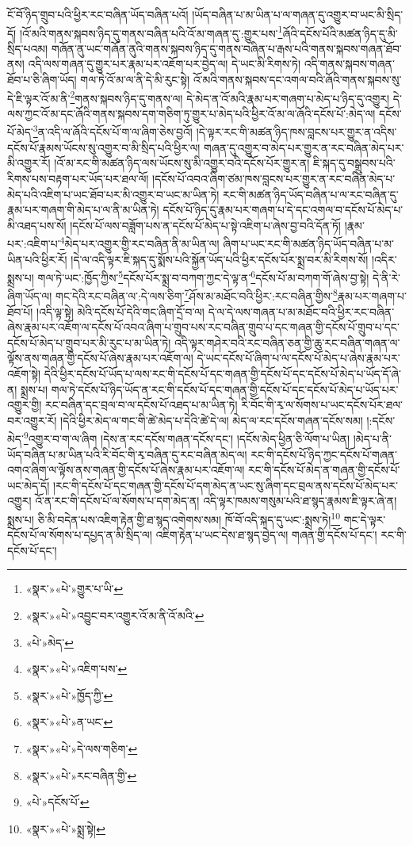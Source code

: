 ངོ་བོ་ཉིད་གྲུབ་པའི་ཕྱིར་རང་བཞིན་ཡོད་བཞིན་པའོ། །ཡོད་བཞིན་པ་མ་ཡིན་པ་ལ་གཞན་དུ་འགྱུར་བ་ཡང་མི་སྲིད་དོ། །འོ་མའི་གནས་སྐབས་ཉིད་དུ་གནས་བཞིན་པའི་འོ་མ་གཞན་དུ་:གྱུར་པས་\footnote{«སྣར་»«པེ་»གྱུར་པ་ཡི་}ཞོའི་དངོས་པོའི་མཚན་ཉིད་དུ་མི་སྲིད་པའམ། གཞོན་ནུ་ཡང་གཞོན་ནུའི་གནས་སྐབས་ཉིད་དུ་གནས་བཞིན་པ་རྒས་པའི་གནས་སྐབས་གཞན་ཐོབ་ནས། འདི་ལས་གཞན་དུ་གྱུར་པར་རྣམ་པར་འཇོག་པར་བྱེད་ལ། དེ་ཡང་མི་རིགས་ཏེ། འདི་གནས་སྐབས་གཞན་ཐོབ་པ་ཅི་ཞིག་ཡོད། གལ་ཏེ་འོ་མ་ལ་ནི་དེ་མི་རུང་སྟེ། འོ་མའི་གནས་སྐབས་དང་འགལ་བའི་ཞོའི་གནས་སྐབས་སུ་དེ་ཇི་ལྟར་འོ་མ་ནི་\footnote{«སྣར་»«པེ་»འབྱུང་བར་འགྱུར་འོ་མ་ནི་འོ་མའི་}གནས་སྐབས་ཉིད་དུ་གནས་ལ། དེ་མེད་ན་འོ་མའི་རྣམ་པར་གཞག་པ་མེད་པ་ཉིད་དུ་འགྱུར། དེ་ལས་ཀྱང་འོ་མ་དང་ཞོའི་གནས་སྐབས་དག་གཅིག་ཏུ་གྱུར་པ་མེད་པའི་ཕྱིར་འོ་མ་ལ་ཞོའི་དངོས་པོ་:མེད་ལ། དངོས་པོ་མེད་\footnote{«པེ་»མེད་}ན་འདི་ལ་ཞོའི་དངོས་པོ་ག་ལ་ཞིག་ཅེས་བྱའོ། །དེ་ལྟར་རང་གི་མཚན་ཉིད་ཁས་བླངས་པར་གྱུར་ན་འདིས་དངོས་པོ་རྣམས་ཡོངས་སུ་འགྱུར་བ་མི་སྲིད་པའི་ཕྱིར་ལ། གཞན་དུ་འགྱུར་བ་མེད་པར་གྱུར་ན་རང་བཞིན་མེད་པར་མི་འགྱུར་རོ། །འོ་མ་རང་གི་མཚན་ཉིད་ལས་ཡོངས་སུ་མི་འགྱུར་བའི་དངོས་པོར་གྱུར་ན། ཇི་སྐད་དུ་བསྒྲུབས་པའི་རིགས་པས་བརྟག་པར་ཡོད་པར་ཐལ་ལོ། །དངོས་པོ་འབའ་ཞིག་ཙམ་ཁས་བླངས་པར་གྱུར་ན་རང་བཞིན་མེད་པ་མེད་པའི་འཇིག་པ་ཡང་ཐོབ་པར་མི་འགྱུར་བ་ཡང་མ་ཡིན་ཏེ། རང་གི་མཚན་ཉིད་ཡོད་བཞིན་པ་ལ་རང་བཞིན་དུ་རྣམ་པར་གཞག་གི་མེད་པ་ལ་ནི་མ་ཡིན་ཏེ། དངོས་པོ་ཉིད་དུ་རྣམ་པར་གཞག་པ་དེ་དང་འགལ་བ་དངོས་པོ་མེད་པ་མི་འཐད་པས་སོ། །དངོས་པོ་ལས་བཟློག་པས་ན་དངོས་པོ་མེད་པ་སྟེ་འཇིག་པ་ཞེས་བྱ་བའི་དོན་ཏོ། །རྣམ་པར་:འཇིག་པ་\footnote{«སྣར་»«པེ་»འཇིག་པས་}མེད་པར་འགྱུར་གྱི་རང་བཞིན་ནི་མ་ཡིན་ལ། ཞིག་པ་ཡང་རང་གི་མཚན་ཉིད་ཡོད་བཞིན་པ་མ་ཡིན་པའི་ཕྱིར་རོ། །དེ་ལ་འདི་ལྟར་ཇི་སྐད་དུ་སྨོས་པའི་སྐྱོན་ཡོད་པའི་ཕྱིར་དངོས་པོར་སྨྲ་བར་མི་རིགས་སོ། །འདིར་སྨྲས་པ། གལ་ཏེ་ཡང་:ཁྱོད་ཀྱིས་\footnote{«སྣར་»«པེ་»ཁྱོད་ཀྱི་}དངོས་པོར་སྨྲ་བ་བཀག་ཀྱང་དེ་ལྟ་ན་\footnote{«སྣར་»«པེ་»ན་ཡང་}དངོས་པོ་མ་བཀག་གོ་ཞེས་བྱ་སྟེ། དེ་ནི་རེ་ཞིག་ཡོད་ལ། གང་དེའི་རང་བཞིན་ལ་:དེ་ལས་ཅིག་\footnote{«སྣར་»«པེ་»དེ་ལས་གཅིག་}ཤོས་མ་མཐོང་བའི་ཕྱིར་:རང་བཞིན་གྱིས་\footnote{«སྣར་»«པེ་»རང་བཞིན་གྱི་}རྣམ་པར་གཞག་པ་ཐོབ་པོ། །འདི་ལྟ་སྟེ། མེའི་དངོས་པོ་དེའི་གང་ཞིག་དྲོ་བ་ལ། དེ་ལ་དེ་ལས་གཞན་པ་མ་མཐོང་བའི་ཕྱིར་རང་བཞིན་ཞེས་རྣམ་པར་འཇོག་ལ་དངོས་པོ་འབའ་ཞིག་པ་གྲུབ་པས་རང་བཞིན་གྲུབ་པ་དང་གཞན་གྱི་དངོས་པོ་གྲུབ་པ་དང་དངོས་པོ་མེད་པ་གྲུབ་པར་མི་རུང་པ་མ་ཡིན་ཏེ། འདི་ལྟར་གཤེར་བའི་རང་བཞིན་ཅན་གྱི་ཆུ་རང་བཞིན་གཞན་ལ་ལྟོས་ནས་གཞན་གྱི་དངོས་པོ་ཞེས་རྣམ་པར་འཇོག་ལ། དེ་ཡང་དངོས་པོ་ཞིག་པ་ལ་དངོས་པོ་མེད་པ་ཞེས་རྣམ་པར་འཇོག་སྟེ། དེའི་ཕྱིར་དངོས་པོ་ཡོད་པ་ལས་རང་གི་དངོས་པོ་དང་གཞན་གྱི་དངོས་པོ་དང་དངོས་པོ་མེད་པ་ཡོད་དོ་ཞེ་ན། སྨྲས་པ། གལ་ཏེ་དངོས་པོ་ཉིད་ཡོད་ན་རང་གི་དངོས་པོ་དང་གཞན་གྱི་དངོས་པོ་དང་དངོས་པོ་མེད་པ་ཡོད་པར་འགྱུར་གྱི། རང་བཞིན་དང་བྲལ་བ་ལ་དངོས་པོ་འཐད་པ་མ་ཡིན་ཏེ། རི་བོང་གི་རྭ་ལ་སོགས་པ་ཡང་དངོས་པོར་ཐལ་བར་འགྱུར་རོ། །དེའི་ཕྱིར་མེད་ལ་གང་གི་ཚེ་མེད་པ་དེའི་ཚེ་དེ་ལ། མེད་ལ་རང་དངོས་གཞན་དངོས་སམ། །:དངོས་མེད་\footnote{«པེ་»དངོས་པོ་}འགྱུར་བ་ག་ལ་ཞིག །དེས་ན་རང་དངོས་གཞན་དངོས་དང་། །དངོས་མེད་ཕྱིན་ཅི་ལོག་པ་ཡིན། །མེད་པ་ནི་ཡོད་བཞིན་པ་མ་ཡིན་པའི་རི་བོང་གི་རྭ་བཞིན་དུ་རང་བཞིན་མེད་ལ། རང་གི་དངོས་པོ་ཉིད་ཀྱང་དངོས་པོ་གཞན་འགའ་ཞིག་ལ་ལྟོས་ནས་གཞན་གྱི་དངོས་པོ་ཞེས་རྣམ་པར་འཇོག་ལ། རང་གི་དངོས་པོ་མེད་ན་གཞན་གྱི་དངོས་པོ་ཡང་མེད་དོ། །རང་གི་དངོས་པོ་དང་གཞན་གྱི་དངོས་པོ་དག་མེད་ན་ཡང་སུ་ཞིག་དང་བྲལ་ནས་དངོས་པོ་མེད་པར་འགྱུར། འོ་ན་རང་གི་དངོས་པོ་ལ་སོགས་པ་དག་མེད་ན། འདི་ལྟར་ཁམས་གསུམ་པའི་ཐ་སྙད་རྣམས་ཇི་ལྟར་ཞེ་ན། སྨྲས་པ། ཅི་མི་བདེན་པས་འཇིག་རྟེན་གྱི་ཐ་སྙད་འགེགས་སམ། ཁོ་བོ་འདི་སྐད་དུ་ཡང་:སྨྲས་ཏེ།\footnote{«སྣར་»«པེ་»སྨྲ་སྟེ།} གང་དེ་ལྟར་དངོས་པོ་ལ་སོགས་པ་དཔྱད་ན་མི་སྲིད་ལ། འཇིག་རྟེན་པ་ཡང་དེས་ཐ་སྙད་བྱེད་ལ། གཞན་གྱི་དངོས་པོ་དང་། རང་གི་དངོས་པོ་དང་། 